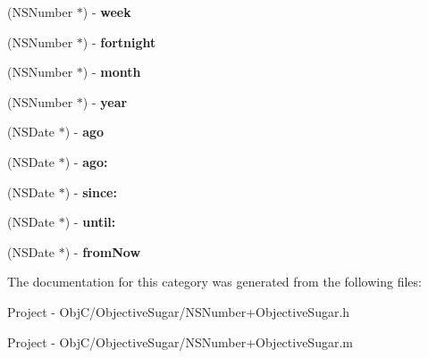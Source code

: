 \begin{DoxyCompactItemize}
\item 
\hypertarget{category_n_s_number_07_objective_sugar_08_af34e9eded153ded5989e1e62454ad05c}{}(N\+S\+Number $\ast$) -\/ {\bfseries week}\label{category_n_s_number_07_objective_sugar_08_af34e9eded153ded5989e1e62454ad05c}

\item 
\hypertarget{category_n_s_number_07_objective_sugar_08_ac1ddf6842cf40ba011c33b7076aabaa9}{}(N\+S\+Number $\ast$) -\/ {\bfseries fortnight}\label{category_n_s_number_07_objective_sugar_08_ac1ddf6842cf40ba011c33b7076aabaa9}

\item 
\hypertarget{category_n_s_number_07_objective_sugar_08_a156820b4ded3dba725d1b72a99f1edf5}{}(N\+S\+Number $\ast$) -\/ {\bfseries month}\label{category_n_s_number_07_objective_sugar_08_a156820b4ded3dba725d1b72a99f1edf5}

\item 
\hypertarget{category_n_s_number_07_objective_sugar_08_afe48ad7551932e03bcbaaee52395fa6d}{}(N\+S\+Number $\ast$) -\/ {\bfseries year}\label{category_n_s_number_07_objective_sugar_08_afe48ad7551932e03bcbaaee52395fa6d}

\item 
\hypertarget{category_n_s_number_07_objective_sugar_08_a462398f958430fa44b68f76f1ab81edb}{}(N\+S\+Date $\ast$) -\/ {\bfseries ago}\label{category_n_s_number_07_objective_sugar_08_a462398f958430fa44b68f76f1ab81edb}

\item 
\hypertarget{category_n_s_number_07_objective_sugar_08_a2670ab0fcd3d770cd3fec3a5da0bfd75}{}(N\+S\+Date $\ast$) -\/ {\bfseries ago\+:}\label{category_n_s_number_07_objective_sugar_08_a2670ab0fcd3d770cd3fec3a5da0bfd75}

\item 
\hypertarget{category_n_s_number_07_objective_sugar_08_a6be3c168e759831ffe28945e82760c96}{}(N\+S\+Date $\ast$) -\/ {\bfseries since\+:}\label{category_n_s_number_07_objective_sugar_08_a6be3c168e759831ffe28945e82760c96}

\item 
\hypertarget{category_n_s_number_07_objective_sugar_08_ad4513b421a65d5c349a91a5da39e9649}{}(N\+S\+Date $\ast$) -\/ {\bfseries until\+:}\label{category_n_s_number_07_objective_sugar_08_ad4513b421a65d5c349a91a5da39e9649}

\item 
\hypertarget{category_n_s_number_07_objective_sugar_08_aed580bcb7fd5600287a911aebd902087}{}(N\+S\+Date $\ast$) -\/ {\bfseries from\+Now}\label{category_n_s_number_07_objective_sugar_08_aed580bcb7fd5600287a911aebd902087}

\end{DoxyCompactItemize}


The documentation for this category was generated from the following files\+:\begin{DoxyCompactItemize}
\item 
Project -\/ Obj\+C/\+Objective\+Sugar/N\+S\+Number+\+Objective\+Sugar.\+h\item 
Project -\/ Obj\+C/\+Objective\+Sugar/N\+S\+Number+\+Objective\+Sugar.\+m\end{DoxyCompactItemize}
